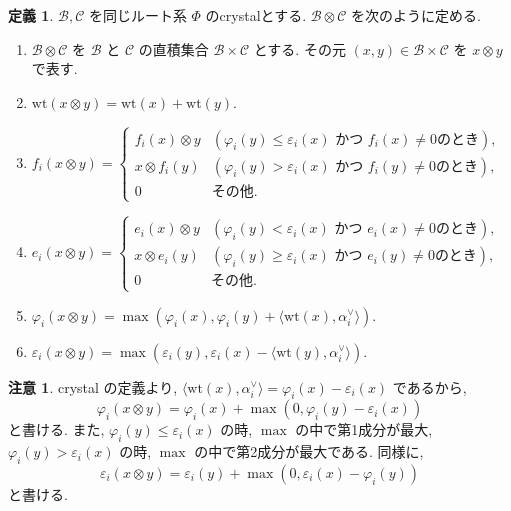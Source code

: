 \documentclass[
  a4paper, 
  12pt,
  ja=standard,
  xelatex,
  left=30truemm,
  right=30truemm,
  titlepage 
]{bxjsarticle}
\theoremstyle{definition}
\newtheorem{df}{定義}[section]
\newtheorem*{re}{注意}
\begin{document}
\begin{df}
  $\mathcal{B}, \mathcal{C}$ を同じルート系 $\Phi$ のcrystalとする.
  $\mathcal{B} \otimes \mathcal{C}$ を次のように定める.
  \begin{enumerate}
    \item $\mathcal{B} \otimes \mathcal{C}$ を $\mathcal{B}$ と $\mathcal{C}$ の直積集合 $\mathcal{B} \times \mathcal{C}$ とする.
    その元 $(x, y) \in \mathcal{B} \times \mathcal{C}$ を $x \otimes y$ で表す.
    \item $\mathrm{wt}(x \otimes y) = \mathrm{wt}(x) + \mathrm{wt}(y)$.
    \item $f_i(x \otimes y) = 
    \begin{cases} 
      f_i(x) \otimes y & ( \varphi_i(y) \leq \varepsilon_i(x) \text{ かつ } f_i(x) \neq 0 \text{のとき} ), \\
      x \otimes f_i(y) & ( \varphi_i(y) > \varepsilon_i(x) \text{ かつ } f_i(y) \neq 0 \text{のとき} ), \\
      0 & \text{その他}.
    \end{cases}$
    \item $e_i(x \otimes y) = 
    \begin{cases} 
      e_i(x) \otimes y & ( \varphi_i(y) < \varepsilon_i(x) \text{ かつ } e_i(x) \neq 0 \text{のとき} ), \\
      x \otimes e_i(y) & ( \varphi_i(y) \geq \varepsilon_i(x) \text{ かつ } e_i(y) \neq 0 \text{のとき} ), \\
      0 & \text{その他}.
    \end{cases}$
    \item $\varphi_i(x \otimes y) = \max{(\varphi_i(x), \varphi_i(y) + \langle \mathrm{wt}(x), \alpha_i^{\vee} \rangle)}$.
    \item $\varepsilon_i(x \otimes y) = \max{(\varepsilon_i(y), \varepsilon_i(x) - \langle \mathrm{wt}(y), \alpha_i^{\vee} \rangle)}$.
  \end{enumerate}
\end{df}

\begin{re}
  crystal の定義より, $\langle \mathrm{wt}(x), \alpha_i^{\vee} \rangle = \varphi_i(x) - \varepsilon_i(x)$ であるから,
  $$\varphi_i(x \otimes y) = \varphi_i(x) + \max ( 0, \varphi_i(y) - \varepsilon_i(x) ) $$
  と書ける. また, $\varphi_i(y) \leq \varepsilon_i(x)$ の時, $\max$ の中で第1成分が最大,
  $\varphi_i(y) > \varepsilon_i(x)$ の時, $\max$ の中で第2成分が最大である.
  同様に, 
  $$\varepsilon_i(x \otimes y) = \varepsilon_i(y) + \max ( 0, \varepsilon_i(x) -  \varphi_i(y)) $$
  と書ける.
\end{re}
\end{document}
